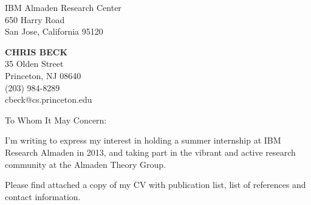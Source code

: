 \documentclass{letter}
\begin{document}
\signature{Chris Beck}                  %
\longindentation=0pt                     %
\let\raggedleft\raggedright              %
 
\begin{letter}{IBM Almaden Research Center \\
650 Harry Road\\
San Jose, California 95120} 

\begin{center}
{\large\bf CHRIS BECK} \\
{35 Olden Street \\ Princeton, NJ 08640  \\ (203) 984-8289} \\ cbeck@cs.princeton.edu \\
\end{center} \vfill %
 

\opening{To Whom It May Concern:} 

\noindent I'm writing to express my interest in holding a summer internship at IBM Research Almaden in 2013, and taking part in the vibrant and active research community at the Almaden Theory Group.
 
\noindent Please find attached a copy of my CV with publication list, list of references and contact information.



\end{letter}
\end{document}
